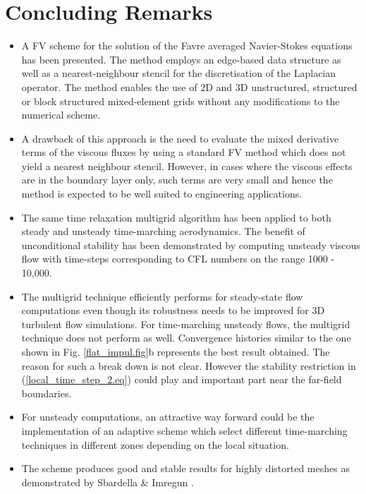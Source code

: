 \section{Concluding Remarks}
%
\begin{itemize}
%
 \item
 A FV scheme for the solution of the Favre averaged
 Navier-Stokes equations has been presented. The method employs an edge-based
 data structure as well as  a nearest-neighbour stencil for the discretisation of
 the Laplacian operator. The method enables the use of 2D and 3D
 unstructured, structured or block structured mixed-element grids without any modifications
 to the numerical scheme.
% 
\item
 A drawback of this approach is the need to evaluate the mixed
 derivative terms of the viscous fluxes by using a standard FV method which does not yield
 a nearest neighbour stencil.
 However, in cases where the viscous effects are in the boundary layer
 only, such terms are
 very small and hence the method is expected to be well suited to
 engineering applications.
%
\item
 The same time relaxation multigrid algorithm has been applied to both
 steady and unsteady time-marching aerodynamics. The benefit of unconditional
 stability has been demonstrated by computing unsteady
 viscous flow with time-steps corresponding to CFL numbers on the
 range 1000 - 10,000.
%
\item
 The multigrid technique efficiently performs for steady-state flow
 computations even though its robustness needs to be improved for 3D
 turbulent flow simulations.
 For time-marching unsteady flows, the multigrid technique does not
 perform as well. Convergence histories similar to the one
 shown in Fig. \ref{flat_impul.fig}b represents the best result
 obtained. The reason for such a break down is not clear. However
 the stability restriction in (\ref{local_time_step_2.eq}) could
 play and important part near the far-field boundaries.
%
\item
 For unsteady computations, an attractive way forward could be the
 implementation of an adaptive scheme which select different
 time-marching techniques in different zones depending on the
 local situation.
%
\item
 The scheme produces good and stable results for highly distorted
 meshes as demonstrated by Sbardella \& Imregun \citeyear{Luca:11}. 
%
\end{itemize}
%

